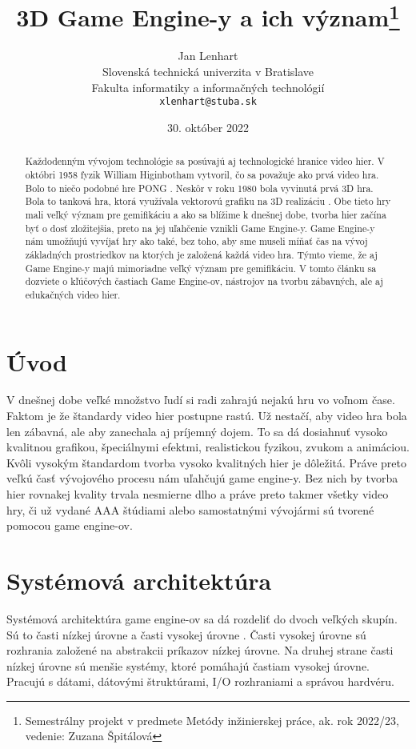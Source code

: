 \documentclass[10pt,oneside,slovak,a4paper,hidelinks]{article}
\title{3D Game Engine-y a ich význam\thanks{Semestrálny projekt v predmete Metódy inžinierskej práce, ak. rok 2022/23, vedenie: Zuzana Špitálová}} %
\author{Jan Lenhart\\[2pt]
	{\small Slovenská technická univerzita v Bratislave}\\
	{\small Fakulta informatiky a informačných technológií}\\
	{\small \texttt{xlenhart@stuba.sk}}
}
\date{\small 30. október 2022} %
\begin{document}
	
	\maketitle
	
	\vspace*{\fill}
	\begin{abstract}
		Každodenným vývojom technológie sa posúvajú aj technologické hranice video hier. V októbri 1958 fyzik William Higinbotham vytvoril, čo sa považuje ako prvá video hra. Bolo to niečo podobné hre PONG \cite{FirstGame}. Neskôr v roku 1980 bola vyvinutá prvá 3D hra. Bola to tanková hra, ktorá využívala vektorovú grafiku na 3D realizáciu \cite{First3DGame}. Obe tieto hry mali veľký význam pre gemifikáciu a ako sa blížime k dnešnej dobe, tvorba hier začína byť o dosť zložitejšia, preto na jej uľahčenie vznikli Game Engine-y. Game Engine-y nám umožňujú vyvíjať hry ako také, bez toho, aby sme museli míňať čas na vývoj základných prostriedkov na ktorých je založená každá video hra. Týmto vieme, že aj Game Engine-y majú mimoriadne veľký význam pre gemifikáciu. V tomto článku sa dozviete o kľúčových častiach Game Engine-ov, nástrojov na tvorbu zábavných, ale aj edukačných video hier.
	\end{abstract}
	\vspace*{\fill}
	
	\pagebreak
	
	\section{Úvod}
		V dnešnej dobe veľké množstvo ľudí si radi zahrajú nejakú hru vo voľnom čase. Faktom je že štandardy video hier postupne rastú. Už nestačí, aby video hra bola len zábavná, ale aby zanechala aj príjemný dojem. To sa dá dosiahnuť vysoko kvalitnou grafikou, špeciálnymi efektmi, realistickou fyzikou, zvukom a animáciou. Kvôli vysokým štandardom tvorba vysoko kvalitných hier je dôležitá. Práve preto veľkú časť vývojového procesu nám uľahčujú game engine-y. Bez nich by tvorba hier rovnakej kvality trvala nesmierne dlho a práve preto takmer všetky video hry, či už vydané AAA štúdiami alebo samostatnými vývojármi sú tvorené pomocou game engine-ov.
	\section{Systémová architektúra}
		Systémová architektúra game engine-ov sa dá rozdeliť do dvoch veľkých skupín. Sú to časti nízkej úrovne a časti vysokej úrovne \cite{Primary}. Časti vysokej úrovne sú rozhrania založené na abstrakcii príkazov nízkej úrovne. Na druhej strane časti nízkej úrovne sú menšie systémy, ktoré pomáhajú častiam vysokej úrovne. Pracujú s dátami, dátovými štruktúrami, I/O rozhraniami a správou hardvéru.
\end{document}
